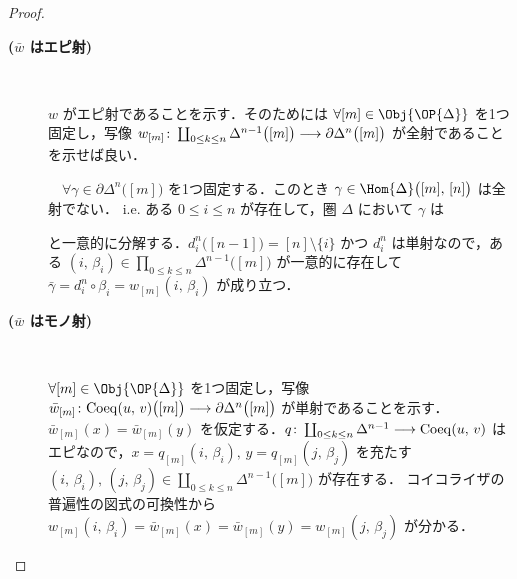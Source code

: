 \documentclass[TQFT_main]{subfiles}
\begin{document}
\begin{proof}
    \begin{description}
        \item[\textbf{($\bar{w}$ はエピ射)}]　
        
        $w$ がエピ射であることを示す．そのためには $\forall [m] \in \Obj{\OP{\Delta}}$ を1つ固定し，写像 $w_{[m]} \colon \coprod_{0 \le k \le n} \Delta^{n-1} \bigl( [m] \bigr)  \longrightarrow \partial \Delta^n \bigl( [m] \bigr) $ が全射であることを示せば良い．
        
        　$\forall \gamma \in \partial \Delta^n\bigl([m]\bigr)$ を1つ固定する．このとき $\gamma \in \Hom{\Delta} \bigl([m],\, [n]\bigr)$ は全射でない．
        i.e. ある $0 \le i \le n$ が存在して，圏 $\Delta$ において $\gamma$ は
        \begin{center}
        \end{center}
        と一意的に分解する．$d_i^n \bigl([n-1]\bigr) = [n] \setminus \{i\}$ かつ $d_i^n$ は単射なので，ある $(i,\, \beta_i) \in \prod_{0 \le k \le n} \Delta^{n-1} \bigl( [m] \bigr)$ が一意的に存在して $\bar{\gamma} = d_i^n \circ \beta_i =  w_{[m]}(i,\, \beta_i)$ が成り立つ．

        \item[\textbf{($\bar{w}$ はモノ射)}]　
        
        $\forall [m] \in \Obj{\OP{\Delta}}$ を1つ固定し，写像 $\bar{w}_{[m]} \colon \mathrm{Coeq}(u,\, v) \bigl( [m] \bigr)  \longrightarrow \partial \Delta^n \bigl( [m] \bigr) $ が単射であることを示す．
        $\bar{w}_{[m]}(x) = \bar{w}_{[m]}(y)$ を仮定する．$q \colon \coprod_{0 \le k \le n} \Delta^{n-1} \longrightarrow \mathrm{Coeq} (u,\, v)$ はエピなので，$x = q_{[m]} (i,\, \beta_i),\, y = q_{[m]} (j,\, \beta_j)$ を充たす $(i,\, \beta_i),\, (j,\, \beta_j) \in \coprod_{0 \le k \le n} \Delta^{n-1} \bigl( [m] \bigr)$ が存在する．
        コイコライザの普遍性の図式の可換性から $w_{[m]} (i,\, \beta_i) = \bar{w}_{[m]}(x) = \bar{w}_{[m]}(y) = w_{[m]} (j,\, \beta_j)$ が分かる．
        

\end{description}
\end{proof}
\end{document}
